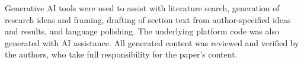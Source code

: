 
Generative AI tools were used to assist with literature search,
generation of research ideas and framing, drafting of section text
from author-specified ideas and results, and language polishing.
The underlying platform code was also generated with AI assistance.
All generated content was reviewed and verified by the authors,
who take full responsibility for the paper's content.
